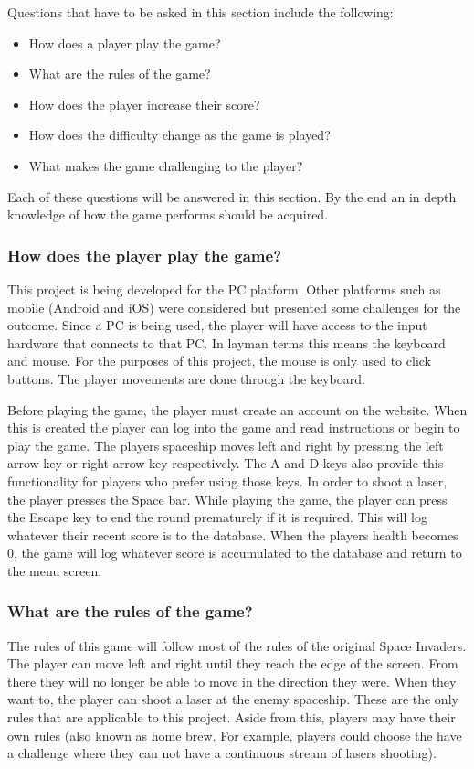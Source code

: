 \documentclass[12pt]{article}
\begin{document}
Questions that have to be asked in this section include the following:

\begin{itemize}
\item How does a player play the game?
\item What are the rules of the game?
\item How does the player increase their score?
\item How does the difficulty change as the game is played?
\item What makes the game challenging to the player?
\end{itemize}
Each of these questions will be answered in this section. By the end an in depth knowledge of how the game performs should be acquired. 

\subsubsection{How does the player play the game?}
This project is being developed for the PC platform. Other platforms such as mobile (Android and iOS) were considered but presented some challenges for the outcome. Since a PC is being used, the player will have access to the input hardware that connects to that PC. In layman terms this means the keyboard and mouse. For the purposes of this project, the mouse is only used to click buttons. The player movements are done through the keyboard. 

Before playing the game, the player must create an account on the website. When this is created the player can log into the game and read instructions or begin to play the game. The players spaceship moves left and right by pressing the left arrow key or right arrow key respectively. The A and D keys also provide this functionality for players who prefer using those keys. In order to shoot a laser, the player presses the Space bar. While playing the game, the player can press the Escape key to end the round prematurely if it is required. This will log whatever their recent score is to the database. When the players health becomes 0, the game will log whatever score is accumulated to the database and return to the menu screen.

\subsubsection{What are the rules of the game?}
The rules of this game will follow most of the rules of the original Space Invaders. The player can move left and right until they reach the edge of the screen. From there they will no longer be able to move in the direction they were. When they want to, the player can shoot a laser at the enemy spaceship. These are the only rules that are applicable to this project. Aside from this, players may have their own rules (also known as home brew. For example, players could choose the have a challenge where they can not have a continuous stream of lasers shooting).
\end{document}
